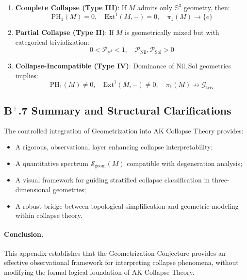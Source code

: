 \documentclass[11pt]{article}
\begin{document}
\begin{enumerate}
    \item \textbf{Complete Collapse (Type III)}:  
    If $M$ admits only $\mathbb{S}^3$ geometry, then:
    \[
    \mathrm{PH}_1(M) = 0,\quad \mathrm{Ext}^1(M, -) = 0,\quad \pi_1(M) \longrightarrow \{e\}
    \]
    \item \textbf{Partial Collapse (Type II)}:  
    If $M$ is geometrically mixed but with categorical trivialization:
    \[
    0 < \mathcal{P}_{\mathbb{S}^3} < 1,\quad \mathcal{P}_{\mathrm{Nil}}, \mathcal{P}_{\mathrm{Sol}} > 0
    \]
    \item \textbf{Collapse-Incompatible (Type IV)}:  
    Dominance of $\mathrm{Nil}, \mathrm{Sol}$ geometries implies:
    \[
    \mathrm{PH}_1(M) \neq 0,\quad \mathrm{Ext}^1(M, -) \neq 0,\quad \pi_1(M) \not\to \mathcal{G}_{\mathrm{triv}}
    \]
\end{enumerate}

\subsection*{B$^{+}$.7 Summary and Structural Clarifications}

The controlled integration of Geometrization into AK Collapse Theory provides:

\begin{itemize}
    \item A rigorous, observational layer enhancing collapse interpretability;
    \item A quantitative spectrum $\mathcal{S}_{\mathrm{geom}}(M)$ compatible with degeneration analysis;
    \item A visual framework for guiding stratified collapse classification in three-dimensional geometries;
    \item A robust bridge between topological simplification and geometric modeling within collapse theory.
\end{itemize}

\paragraph{Conclusion.}  
This appendix establishes that the Geometrization Conjecture provides an effective observational framework for interpreting collapse phenomena, without modifying the formal logical foundation of AK Collapse Theory.



\end{document}
